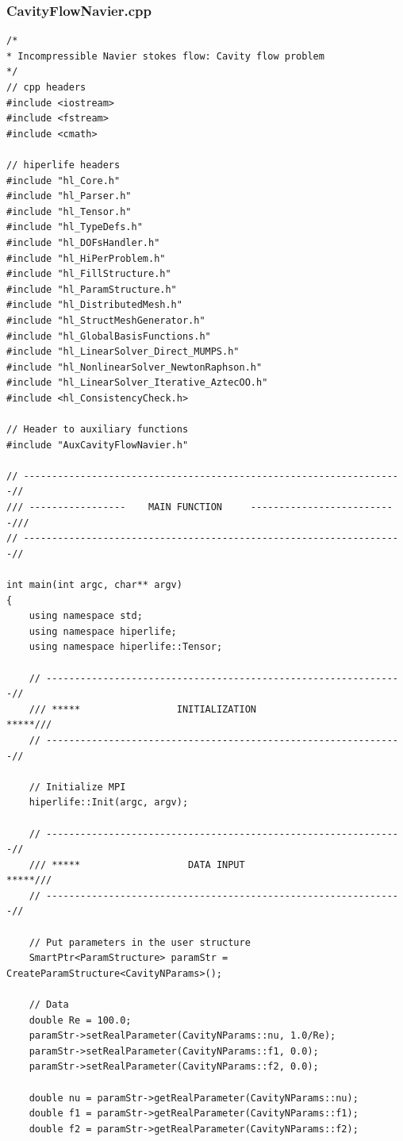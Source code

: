 \documentclass[]{article}
\begin{document}
\subsubsection{CavityFlowNavier.cpp} \label{sec: m.cpp}
\nolinenumbers
\begin{lstlisting}
/*
* Incompressible Navier stokes flow: Cavity flow problem
*/
// cpp headers
#include <iostream>
#include <fstream>
#include <cmath>

// hiperlife headers
#include "hl_Core.h"
#include "hl_Parser.h"
#include "hl_Tensor.h"
#include "hl_TypeDefs.h"  
#include "hl_DOFsHandler.h"
#include "hl_HiPerProblem.h"
#include "hl_FillStructure.h"
#include "hl_ParamStructure.h"
#include "hl_DistributedMesh.h" 
#include "hl_StructMeshGenerator.h" 
#include "hl_GlobalBasisFunctions.h"
#include "hl_LinearSolver_Direct_MUMPS.h"
#include "hl_NonlinearSolver_NewtonRaphson.h"
#include "hl_LinearSolver_Iterative_AztecOO.h"
#include <hl_ConsistencyCheck.h>

// Header to auxiliary functions
#include "AuxCavityFlowNavier.h"

// -------------------------------------------------------------------//
/// -----------------    MAIN FUNCTION     --------------------------///
// -------------------------------------------------------------------//

int main(int argc, char** argv)
{
	using namespace std;
	using namespace hiperlife;
	using namespace hiperlife::Tensor;
	
	// ---------------------------------------------------------------//
	/// *****                 INITIALIZATION                    *****///
	// ---------------------------------------------------------------//
	
	// Initialize MPI
	hiperlife::Init(argc, argv);
	
	// ---------------------------------------------------------------//
	/// *****                   DATA INPUT                      *****///
	// ---------------------------------------------------------------//
	
	// Put parameters in the user structure
	SmartPtr<ParamStructure> paramStr = CreateParamStructure<CavityNParams>();
	
	// Data
	double Re = 100.0;
	paramStr->setRealParameter(CavityNParams::nu, 1.0/Re);
	paramStr->setRealParameter(CavityNParams::f1, 0.0);
	paramStr->setRealParameter(CavityNParams::f2, 0.0);
	
	double nu = paramStr->getRealParameter(CavityNParams::nu);
	double f1 = paramStr->getRealParameter(CavityNParams::f1);
	double f2 = paramStr->getRealParameter(CavityNParams::f2);
	

\end{lstlisting}
\end{document}
